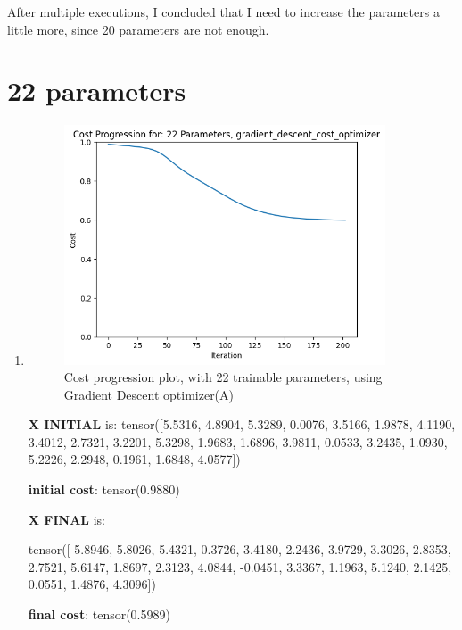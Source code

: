 \documentclass[inscr,ack,preface]{diphdthesis}
\begin{document}
After multiple executions, I concluded that I need to increase the parameters a little more, since 20 parameters are not enough.

\section{22 parameters}

\begin{enumerate}[label=\textbf{\Alph*.}]
    \item \textbf{ }

    \begin{figure}[H]
        \centering
        \includegraphics[width=0.9\textwidth]{22.png}
        \caption{Cost progression plot, with 22 trainable parameters, using Gradient Descent optimizer(A)} 
        \label{fig:fig1}
    \end{figure}

    \textbf{X INITIAL} is:
    tensor([5.5316, 4.8904, 5.3289, 0.0076, 3.5166, 1.9878, 4.1190, 3.4012, 2.7321,
            3.2201, 5.3298, 1.9683, 1.6896, 3.9811, 0.0533, 3.2435, 1.0930, 5.2226,
            2.2948, 0.1961, 1.6848, 4.0577])
            
    \textbf{initial cost}: tensor(0.9880)
    
    \textbf{X FINAL} is:
    
    tensor([ 5.8946,  5.8026,  5.4321,  0.3726,  3.4180,  2.2436,  3.9729,  3.3026,
             2.8353,  2.7521,  5.6147,  1.8697,  2.3123,  4.0844, -0.0451,  3.3367,
             1.1963,  5.1240,  2.1425,  0.0551,  1.4876,  4.3096])
    
    \textbf{final cost}: tensor(0.5989)
    

\end{enumerate}
\end{document}

